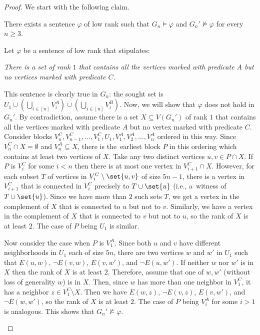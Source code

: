 \begin{proof}
    We start with the following claim.
    \begin{claim}
        There exists a sentence $\varphi$ of low rank \mso such that $G_n \models \varphi$ and $G_n' \not \models \varphi$ for every $n \ge 3$.
    \end{claim}
    \begin{claimproof}
        Let $\varphi$ be a sentence of low rank \mso that stipulates:
        \begin{center}
            \textit{There is a set of rank $1$ that contains all the vertices marked with predicate $A$ but no vertices marked with predicate $C$.}
        \end{center}
        This sentence is clearly true in $G_n$: the sought set is $U_1 \cup \left(\bigcup_{i \in [n]} V_i^A\right) \cup \left(\bigcup_{i \in [n]} V_i^B\right)$.
        Now, we will show that $\varphi$ does not hold in $G_n'$.
        By contradiction, assume there is a set $X \subseteq V(G_n')$ of rank $1$ that contains all the vertices marked with predicate $A$ but no vertex marked with predicate $C$.
        Consider blocks $V_n^C, V_{n-1}^C, \ldots, V_1^C, U_1, V_1^A, V_2^A, \ldots, V_n^A$ ordered in this way.
        Since $V_n^C \cap X = \emptyset$ and $V_n^A \subseteq X$, there is the~earliest block $P$ in this ordering which contains at least two vertices of $X$.
        Take any two distinct vertices $u, v \in P \cap X$.
        If $P$ is $V_i^C$ for some $i < n$ then there is at most one vertex in $V_{i+1}^C \cap X$.
        However, for each subset $T$ of vertices in $V_i^C \setminus \set{u, v}$ of size $5n - 1$, there is a vertex in $V_{i+1}^C$ that is connected in $V_{i}^C$ precisely to $T \cup \set{u}$ (i.e., a~witness of $T \cup \set{u}$).
        Since we have more than $2$ such sets $T$, we get a vertex in the complement of $X$ that is connected to $u$ but not to $v$.
        Similarly, we have a vertex in the complement of $X$ that is connected to $v$ but not to $u$, so the rank of $X$ is at least $2$.
        The case of $P$ being $U_1$ is similar.

        Now consider the case when $P$ is $V_1^A$.
        Since both $u$ and $v$ have different neighborhoods in $U_1$ each of size $5n$, there are two vertices $w$ and $w'$ in $U_1$ such that $E(u, w)$, $\neg E(v, w)$, $E(v, w')$, and $\neg E(u, w')$.
        If neither $w$ nor $w'$ is in $X$ then the rank of $X$ is at least $2$.
        Therefore, assume that one of $w, w'$ (without loss of generality $w$) is in $X$.
        Then, since $w$ has more than one neighbor in $V_1^C$, it has a neighbor $z \in V_1^C\setminus X$.
        Then we have $E(w, z)$, $\neg E(v, z)$, $E(v, w')$, and $\neg E(w, w')$, so the rank of $X$ is at least $2$.
        The case of $P$ being $V_i^A$ for some $i > 1$ is analogous.
        This shows that $G_n' \not \models \varphi$.
    \end{claimproof}


\end{proof}
